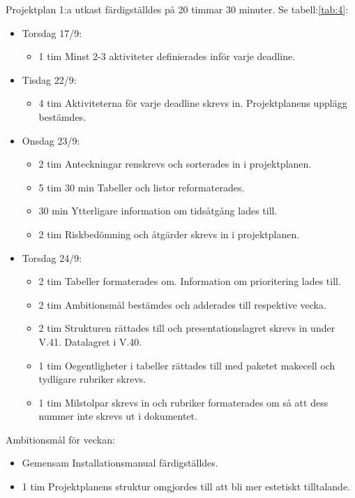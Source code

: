 \documentclass{TDP003mall}
\begin{document}
  Projektplan 1:a utkast färdigställdes på 20 timmar 30 minuter. Se tabell:\ref{tab:4}:
\begin{itemize}
  \item Torsdag 17/9:
  \begin{itemize}
    \item 1 tim Minst 2-3 aktiviteter definierades inför varje deadline.
  \end{itemize}
  \item Tisdag 22/9:
  \begin{itemize}
    \item 4 tim Aktiviteterna för varje deadline skrevs in. Projektplanens upplägg bestämdes.
  \end{itemize}
  \item Onsdag 23/9:
  \begin{itemize}
    \item 2 tim Anteckningar renskrevs och sorterades in i projektplanen.
    \item 5 tim 30 min Tabeller och listor reformaterades.
    \item 30 min Ytterligare information om tidsåtgång lades till.
    \item 2 tim Riskbedömning och åtgärder skrevs in i projektplanen.
  \end{itemize}
  \item Torsdag 24/9:
  \begin{itemize}
    \item 2 tim Tabeller formaterades om. Information om prioritering lades till.
    \item 2 tim Ambitionsmål bestämdes och adderades till respektive vecka.
    \item 2 tim Strukturen rättades till och presentationslagret skrevs in under V.41. Datalagret i V.40.
    \item 1 tim Oegentligheter i tabeller rättades till med paketet makecell och tydligare rubriker skrevs.
    \item 1 tim Milstolpar skrevs in och rubriker formaterades om så att dess nummer inte skrevs ut i dokumentet.
  \end{itemize}
\end{itemize}

Ambitionsmål för veckan:
\begin{itemize}
\item Gemensam Installationsmanual färdigställdes.
  \item 1 tim Projektplanens struktur omgjordes till att bli mer estetiskt tilltalande.
  \end{itemize}
\end{document}
